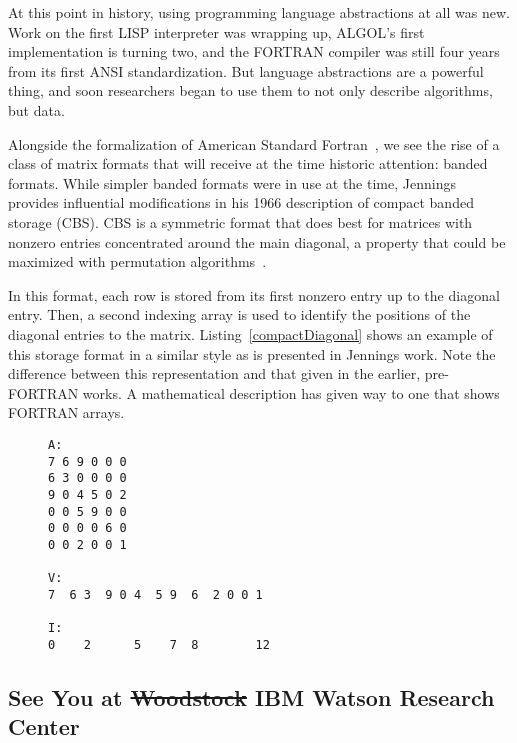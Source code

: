 At this point in history, using programming language abstractions at all was new. 
Work on the first LISP interpreter was wrapping up\cite{mccarthy1978history}, ALGOL's first implementation is turning two\cite{proof}, and the FORTRAN compiler was still four years from its first ANSI standardization\cite{proof}. 
But language abstractions are a powerful thing, and soon researchers began to use them to not only describe algorithms, but data.

Alongside the formalization of American Standard Fortran~\cite{ansi1966fortran}, we see the rise of a class of matrix formats that will receive at the time historic attention: banded formats.
While simpler banded formats were in use at the time, Jennings~\cite{jennings1966compact} provides influential modifications in his 1966 description of compact banded storage (CBS).
CBS is a symmetric format that does best for matrices with nonzero entries concentrated around the main diagonal, a property that could be maximized with permutation algorithms~\cite{alway1965algorithm}.

In this format, each row is stored from its first nonzero entry up to the diagonal entry. 
Then, a second indexing array is used to identify the positions of the diagonal entries to the matrix.
Listing~\ref{compactDiagonal} shows an example of this storage format in a similar style as is presented in Jennings work.
Note the difference between this representation and that given in the earlier, pre-FORTRAN works. 
A mathematical description has given way to one that shows FORTRAN arrays. 

\begin{figure}
\begin{lstlisting}[caption={A symmetric matrix and its compact diagonal storage representation},label={compactDiagonal}]
A:
7 6 9 0 0 0
6 3 0 0 0 0
9 0 4 5 0 2
0 0 5 9 0 0
0 0 0 0 6 0
0 0 2 0 0 1

V:
7  6 3  9 0 4  5 9  6  2 0 0 1

I:
0    2      5    7  8        12
\end{lstlisting}
\end{figure}



\subsection{See You at \sout{Woodstock} IBM Watson Research Center}

